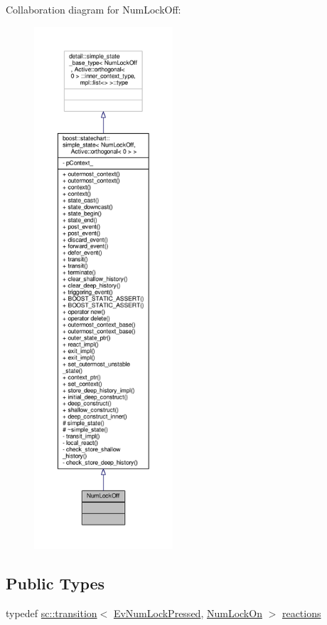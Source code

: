 Collaboration diagram for Num\+Lock\+Off\+:
\nopagebreak
\begin{figure}[H]
\begin{center}
\leavevmode
\includegraphics[height=550pt]{struct_num_lock_off__coll__graph}
\end{center}
\end{figure}
\subsection*{Public Types}
\begin{DoxyCompactItemize}
\item 
typedef \mbox{\hyperlink{classboost_1_1statechart_1_1transition}{sc\+::transition}}$<$ \mbox{\hyperlink{struct_ev_num_lock_pressed}{Ev\+Num\+Lock\+Pressed}}, \mbox{\hyperlink{struct_num_lock_on}{Num\+Lock\+On}} $>$ \mbox{\hyperlink{struct_num_lock_off_ae57735c22d5b1e651f6365ecbf847ab4}{reactions}}
\end{DoxyCompactItemize}
